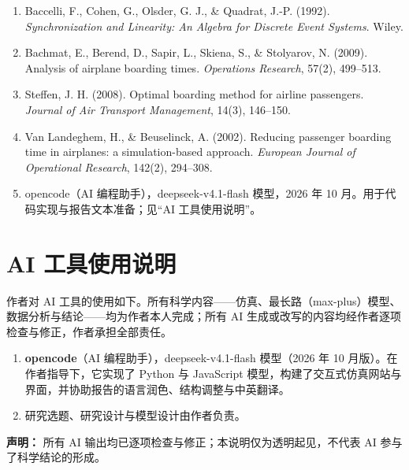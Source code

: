 \documentclass[
  11pt,
  UTF8,
  fontset=windows]{ctexart}
\providecommand{\tightlist}{%
  \setlength{\itemsep}{0pt}\setlength{\parskip}{0pt}}
\begin{document}
\begin{enumerate}
\def\labelenumi{\arabic{enumi}.}
\tightlist
\item
  Baccelli, F., Cohen, G., Olsder, G. J., \& Quadrat, J.-P. (1992).
  \emph{Synchronization and Linearity: An Algebra for Discrete Event
  Systems}. Wiley.
\item
  Bachmat, E., Berend, D., Sapir, L., Skiena, S., \& Stolyarov, N.
  (2009). Analysis of airplane boarding times. \emph{Operations
  Research}, 57(2), 499--513.
\item
  Steffen, J. H. (2008). Optimal boarding method for airline passengers.
  \emph{Journal of Air Transport Management}, 14(3), 146--150.
\item
  Van Landeghem, H., \& Beuselinck, A. (2002). Reducing passenger
  boarding time in airplanes: a simulation-based approach.
  \emph{European Journal of Operational Research}, 142(2), 294--308.
\item
  opencode（AI 编程助手），deepseek-v4.1-flash 模型，2026 年 10
  月。用于代码实现与报告文本准备；见``AI 工具使用说明''。
\end{enumerate}

\section{AI 工具使用说明}\label{ai-ux5de5ux5177ux4f7fux7528ux8bf4ux660e}

作者对 AI
工具的使用如下。所有科学内容------仿真、最长路（max-plus）模型、数据分析与结论------均为作者本人完成；所有
AI 生成或改写的内容均经作者逐项检查与修正，作者承担全部责任。

\begin{enumerate}
\def\labelenumi{\arabic{enumi}.}
\tightlist
\item
  \textbf{opencode}（AI 编程助手），deepseek-v4.1-flash 模型（2026 年 10
  月版）。在作者指导下，它实现了 Python 与 JavaScript
  模型，构建了交互式仿真网站与界面，并协助报告的语言润色、结构调整与中英翻译。
\item
  研究选题、研究设计与模型设计由作者负责。
\end{enumerate}

\textbf{声明：} 所有 AI
输出均已逐项检查与修正；本说明仅为透明起见，不代表 AI
参与了科学结论的形成。
\end{document}
